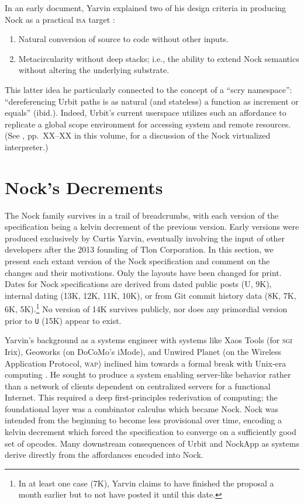 \documentclass[twoside]{article}
\begin{document}
In an early document, Yarvin explained two of his design criteria in producing Nock as a practical \textsc{isa} target \citep{Yarvin2010}:

\begin{enumerate}
  \item  Natural conversion of source to code without other inputs.
  \item  Metacircularity without deep stacks; i.e., the ability to extend Nock semantics without altering the underlying substrate.
\end{enumerate}

This latter idea he particularly connected to the concept of a ``scry namespace'':  ``dereferencing Urbit paths is as natural (and stateless) a function as increment or equals'' (ibid.).  Indeed, Urbit's current userspace utilizes such an affordance to replicate a global scope environment for accessing system and remote resources.  (See \citet{Davis2025b}, pp.~XX–XX in this volume, for a discussion of the Nock virtualized interpreter.)


\section{Nock's Decrements}

The Nock family survives in a trail of breadcrumbs, with each version of the specification being a kelvin decrement of the previous version.  Early versions were produced exclusively by Curtis Yarvin, eventually involving the input of other developers after the 2013 founding of Tlon Corporation.  In this section, we present each extant version of the Nock specification and comment on the changes and their motivations.  Only the layouts have been changed for print.  Dates for Nock specifications are derived from dated public posts (U, 9K), internal dating (13K, 12K, 11K, 10K), or from Git commit history data (8K, 7K, 6K, 5K).\footnote{In at least one case (7K), Yarvin claims to have finished the proposal a month earlier but to not have posted it until this date.}  No version of 14K survives publicly, nor does any primordial version prior to \texttt{U} (15K) appear to exist.

Yarvin's background as a systems engineer with systems like Xaos Tools (for \textsc{sgi} Irix), Geoworks (on DoCoMo's iMode), and Unwired Planet (on the Wireless Application Protocol, \textsc{wap}) inclined him towards a formal break with Unix-era computing \citep{Yarvin2025}.  He sought to produce a system enabling server-like behavior rather than a network of clients dependent on centralized servers for a functional Internet.  This required a deep first-principles rederivation of computing; the foundational layer was a combinator calculus which became Nock.  Nock was intended from the beginning to become less provisional over time, encoding a kelvin decrement which forced the specification to converge on a sufficiently good set of opcodes.  Many downstream consequences of Urbit and NockApp as systems derive directly from the affordances encoded into Nock.
\end{document}
